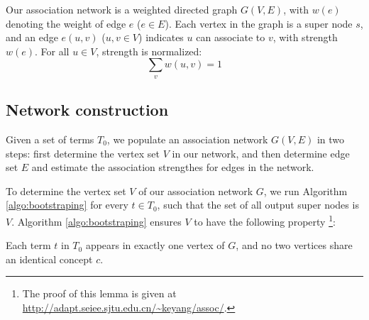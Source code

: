 Our association network is a weighted directed graph $G (V, E)$,
with $w(e)$ denoting the weight of edge $e$ ($e\in E$). Each vertex
in the graph is a super node $s$, and an edge $e(u, v)$ 
($u, v\in V$) indicates $u$ can associate to $v$, with strength $w(e)$.
For all $u\in V$, strength is normalized:
\begin{equation}
\sum_{v} w(u, v) = 1
\label{eq:normalize}
\end{equation}
%

\subsection{Network construction}
\label{sec:construction}

Given a set of terms $T_0$, we populate an association network $G
(V, E)$ in two steps:
first determine the vertex set $V$ in our network, and then determine edge set
$E$ and estimate the association
strengthes for edges in the network. 

To determine the vertex set $V$ of our association network $G$, we
run Algorithm \ref{algo:bootstraping} for every $t\in T_0$, such
that the set of all output super nodes is $V$. Algorithm
\ref{algo:bootstraping} ensures $V$ to have the following property
\footnote{The proof of this lemma is given at
\url{http://adapt.seiee.sjtu.edu.cn/~keyang/assoc/}.}:

\begin{lemma}
Each term $t$ in $T_0$ appears in exactly one vertex of $G$, and
no two vertices share an identical concept $c$.
\end{lemma}

